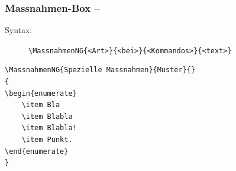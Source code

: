 \documentclass[ngerman,paper=a4,fontsize=8pt,headings=small,draft=no,parskip=half,noonelinecaption]{scrreprt}
\begin{document}

\subsubsection{Massnahmen-Box -- }

\begin{description}
    \item[Syntax:] \lstinline$\MassnahmenNG{<Art>}{<bei>}{<Kommandos>}{<text>}$
%     
\end{description}

% 
% 


\begin{lstlisting}
\MassnahmenNG{Spezielle Massnahmen}{Muster}{}
{
\begin{enumerate}
    \item Bla
    \item Blabla
    \item Blabla!
    \item Punkt.
\end{enumerate}
}
\end{lstlisting}
\end{document}
